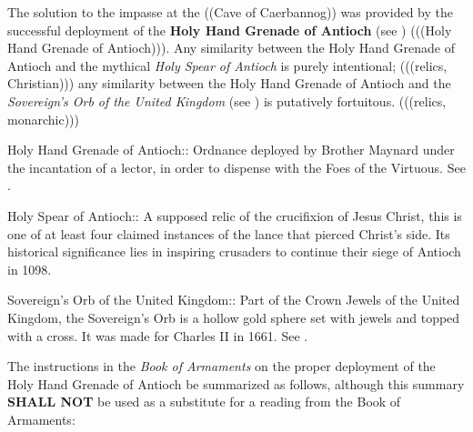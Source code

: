 \documentclass{metanorma}
\let\bcp\relax%
\begin{document}

The solution to the impasse at the ((Cave of Caerbannog)) was
provided by the successful deployment of the
\textbf{Holy Hand Grenade of Antioch} (see )
(((Holy Hand Grenade of Antioch))).
Any similarity between the Holy Hand Grenade of Antioch and the
mythical \textit{Holy Spear of Antioch} is purely intentional;
(((relics, Christian))) any similarity between the Holy Hand Grenade
of Antioch and the \textit{Sovereign's Orb of the United Kingdom}
(see ) is putatively fortuitous.
(((relics, monarchic)))



Holy Hand Grenade of Antioch::
  Ordnance deployed by Brother Maynard under the incantation of a
  lector, in order to dispense with the Foes of the Virtuous.
  See .

Holy Spear of Antioch::
  A supposed relic of the crucifixion of Jesus Christ, this is one
  of at least four claimed instances of the lance that pierced
  Christ's side. Its historical significance lies in inspiring
  crusaders to continue their siege of Antioch in 1098.

Sovereign's Orb of the United Kingdom::
  Part of the Crown Jewels of the United Kingdom, the Sovereign's
  Orb is a hollow gold sphere set with jewels and topped with a
  cross.  It was made for Charles II in 1661. 
  See .



The instructions in the \textit{Book of Armaments} on the proper deployment
of the Holy Hand Grenade of Antioch \bcp{may} be summarized as
follows, although this summary \textbf{SHALL NOT} be used as a substitute
for a reading from the Book of Armaments:



\end{document}
